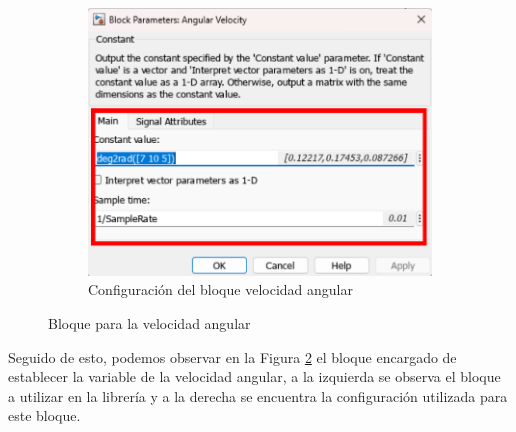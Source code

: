 \begin{figure}[htbp]
\begin{subfigure}[b]{0.45\textwidth}
        \includegraphics[width=\textwidth]{fig/Capitulo5/Caso_de_estudio_IMU/Generador_de_archivos/configuracion_bloque_velocidad_angular.pdf}
        \caption{Configuración del bloque velocidad angular}
        \label{fig:lib_bloques_config_angular_velocity}
    \end{subfigure}
    \caption{Bloque para la velocidad angular}
    \label{fig:angular_velocity_block_simulink}
\end{figure}

Seguido de esto, podemos observar en la Figura \ref{fig:angular_velocity_block_simulink} el bloque encargado de establecer la variable de la velocidad angular, a la izquierda se observa el bloque a utilizar en la librería y a la derecha se encuentra la configuración utilizada para este bloque. 

\newpage

